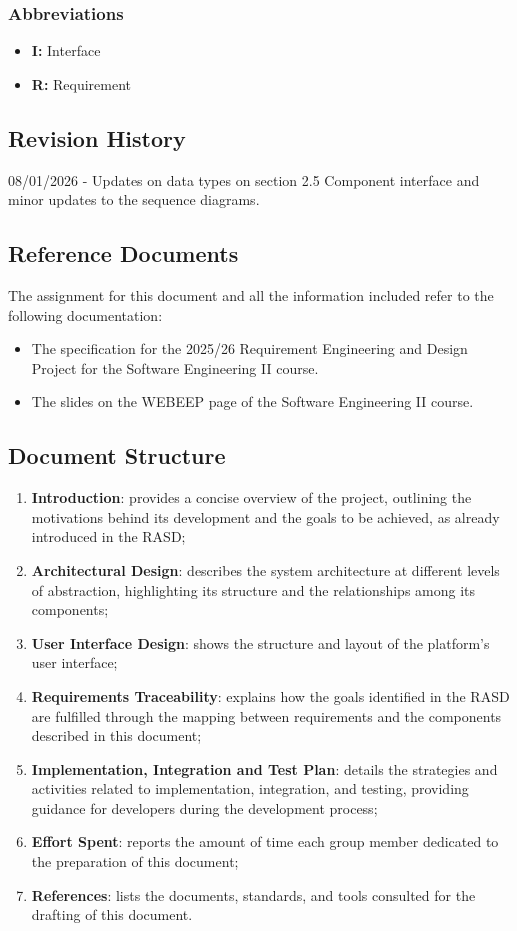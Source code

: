 \subsubsection{Abbreviations}
\begin{itemize}
    \item \textbf{I:} Interface
    \item \textbf{R:} Requirement
\end{itemize}
\subsection{Revision History}
08/01/2026 - Updates on data types on section 2.5 Component interface and minor updates to the sequence diagrams.
\subsection{Reference Documents}
The assignment for this document and all the information included refer to the following documentation:
\begin{itemize}
    \item The specification for the 2025/26 Requirement Engineering and Design Project for the Software Engineering II course.
    \item The slides on the WEBEEP page of the Software Engineering II course.
\end{itemize}
\subsection{Document Structure}
\begin{enumerate}
    \item \textbf{Introduction}: provides a concise overview of the project, outlining the motivations behind its development and the goals to be achieved, as already introduced in the RASD;
    \item \textbf{Architectural Design}: describes the system architecture at different levels of abstraction, highlighting its structure and the relationships among its components;
    \item \textbf{User Interface Design}: shows the structure and layout of the platform’s user interface;
    \item \textbf{Requirements Traceability}: explains how the goals identified in the RASD are fulfilled through the mapping between requirements and the components described in this document;
    \item \textbf{Implementation, Integration and Test Plan}: details the strategies and activities related to implementation, integration, and testing, providing guidance for developers during the development process;
    \item \textbf{Effort Spent}: reports the amount of time each group member dedicated to the preparation of this document;
    \item \textbf{References}: lists the documents, standards, and tools consulted for the drafting of this document. 
\end{enumerate}